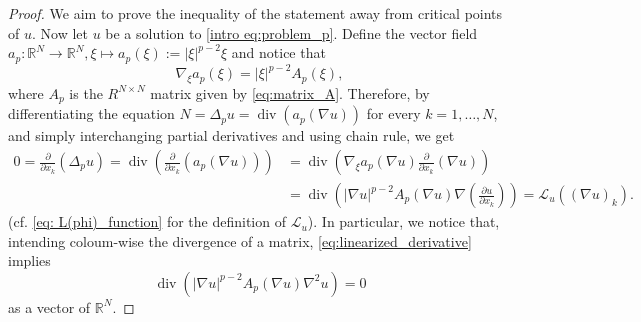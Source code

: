 \documentclass[10pt,a4paper]{amsart}
\numberwithin{equation}{section}
\newcommand{\R}{\mathbb{R}}
\renewcommand{\div}{\operatorname{div}}
\begin{document}
    \begin{proof}
    We aim to prove the inequality of the statement away from critical points of $u$. 
    Now let $u$ be a solution to \eqref{intro eq:problem_p}. Define the vector field $a_p \colon \R^N \to \R^N, \xi \mapsto a_p(\xi):= |\xi|^{p-2} \xi$ and notice that 
    \begin{equation*}
        \nabla_\xi a_p(\xi) = |\xi|^{p-2} A_p(\xi),
    \end{equation*}
    where $A_p$ is the $R^{N\times N}$ matrix given by \eqref{eq:matrix_A}.
    Therefore, by differentiating the equation $N = \Delta_p u = \div(a_p(\nabla u))$
    for every $k=1,\dots,N$, and simply interchanging partial derivatives and using chain rule, we get
    \begin{equation}\label{eq:linearized_derivative}
    \begin{split}
        0 = \frac{\partial}{\partial x_k}(\Delta_p u) = \div \left( \frac{\partial}{\partial x_k}(a_p(\nabla u)) \right) &= \div \left( \nabla_\xi a_p (\nabla u) \frac{\partial}{\partial x_k} (\nabla u)\right) 
        \\
        &= \div \left( |\nabla u|^{p-2} A_p(\nabla u) \nabla \left( \frac{\partial u}{\partial x_k} \right) \right)
        =\mathcal{L}_u((\nabla u)_{k}).
    \end{split}
    \end{equation}
    (cf. \eqref{eq: L(phi)_function} for the definition of $\mathcal{L}_u$). In particular, we notice that, intending coloum-wise the divergence of a matrix, 
    \eqref{eq:linearized_derivative} implies
    \begin{equation}\label{eq:linearized_derivative2}
    \div \left( |\nabla u|^{p-2} A_p(\nabla u) \nabla^2 u \right) = 0       
    \end{equation}
    as a vector of $\R^N$.
    

\end{proof}
\end{document}
